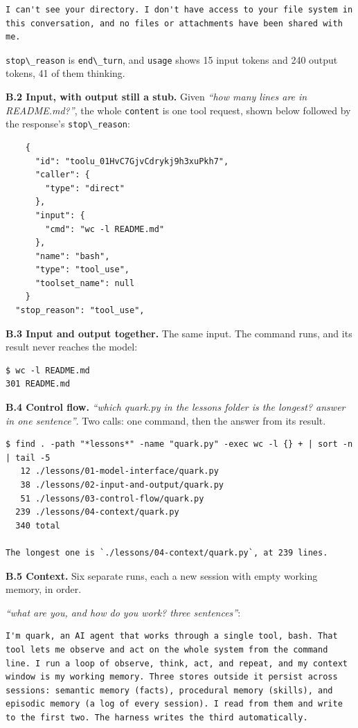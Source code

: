 \begin{lstlisting}
I can't see your directory. I don't have access to your file system in this conversation, and no files or attachments have been shared with me.
\end{lstlisting}

\passthrough{\lstinline!stop\_reason!} is \passthrough{\lstinline!end\_turn!}, and \passthrough{\lstinline!usage!} shows 15 input tokens and 240 output tokens, 41 of them thinking.

\textbf{B.2 Input, with output still a stub.} Given \emph{``how many lines are in README.md?''}, the whole \passthrough{\lstinline!content!} is one tool request, shown below followed by the response's \passthrough{\lstinline!stop\_reason!}:

\begin{lstlisting}
    {
      "id": "toolu_01HvC7GjvCdrykj9h3xuPkh7",
      "caller": {
        "type": "direct"
      },
      "input": {
        "cmd": "wc -l README.md"
      },
      "name": "bash",
      "type": "tool_use",
      "toolset_name": null
    }
  "stop_reason": "tool_use",
\end{lstlisting}

\textbf{B.3 Input and output together.} The same input. The command runs, and its result never reaches the model:

\begin{lstlisting}
$ wc -l README.md
301 README.md
\end{lstlisting}

\textbf{B.4 Control flow.} \emph{``which quark.py in the lessons folder is the longest? answer in one sentence''}. Two calls: one command, then the answer from its result.

\begin{lstlisting}
$ find . -path "*lessons*" -name "quark.py" -exec wc -l {} + | sort -n | tail -5
   12 ./lessons/01-model-interface/quark.py
   38 ./lessons/02-input-and-output/quark.py
   51 ./lessons/03-control-flow/quark.py
  239 ./lessons/04-context/quark.py
  340 total

The longest one is `./lessons/04-context/quark.py`, at 239 lines.
\end{lstlisting}

\textbf{B.5 Context.} Six separate runs, each a new session with empty working memory, in order.

\emph{``what are you, and how do you work? three sentences''}:

\begin{lstlisting}
I'm quark, an AI agent that works through a single tool, bash. That tool lets me observe and act on the whole system from the command line. I run a loop of observe, think, act, and repeat, and my context window is my working memory. Three stores outside it persist across sessions: semantic memory (facts), procedural memory (skills), and episodic memory (a log of every session). I read from them and write to the first two. The harness writes the third automatically.
\end{lstlisting}

